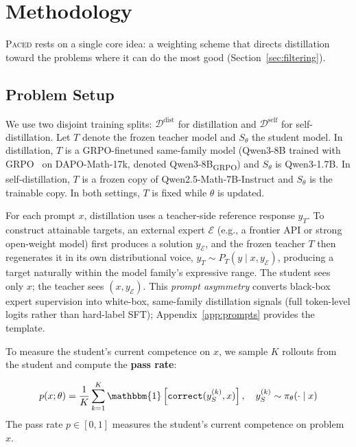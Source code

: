 \documentclass{article}
\begin{document}
\section{Methodology}
\label{sec:method}
\textsc{Paced} rests on a single core idea: a weighting scheme that directs distillation toward the problems where it can do the most good (Section~\ref{sec:filtering}).

\subsection{Problem Setup}
\label{sec:setup}

We use two disjoint training splits: $\mathcal{D}^{\text{dist}}$ for distillation and $\mathcal{D}^{\text{self}}$ for self-distillation. Let $T$ denote the frozen teacher model and $S_\theta$ the student model. In distillation, $T$ is a GRPO-finetuned same-family model (Qwen3-8B trained with GRPO~\citep{shao2024deepseekmath} on DAPO-Math-17k, denoted Qwen3-8B\textsubscript{GRPO}) and $S_\theta$ is Qwen3-1.7B. In self-distillation, $T$ is a frozen copy of Qwen2.5-Math-7B-Instruct and $S_\theta$ is the trainable copy. In both settings, $T$ is fixed while $\theta$ is updated.

For each prompt $x$, distillation uses a teacher-side reference response $y_T$. To construct attainable targets, an external expert $\mathcal{E}$ (e.g., a frontier API or strong open-weight model) first produces a solution $y_{\mathcal{E}}$, and the frozen teacher $T$ then regenerates it in its own distributional voice, $y_T \sim P_T(y \mid x, y_{\mathcal{E}})$, producing a target naturally within the model family's expressive range. The student sees only $x$; the teacher sees $(x, y_{\mathcal{E}})$. This \emph{prompt asymmetry} converts black-box expert supervision into white-box, same-family distillation signals (full token-level logits rather than hard-label SFT); Appendix~\ref{app:prompts} provides the template.

To measure the student's current competence on $x$, we sample $K$ rollouts from the student and compute the \textbf{pass rate}:

\begin{equation}
  p(x; \theta) = \frac{1}{K} \sum_{k=1}^K \mathbbm{1}\left[\texttt{correct}(y_S^{(k)}, x)\right], \quad y_S^{(k)} \sim \pi_\theta(\cdot \mid x)
\end{equation}
The pass rate $p \in [0, 1]$ measures the student's current competence on problem $x$.
\end{document}
